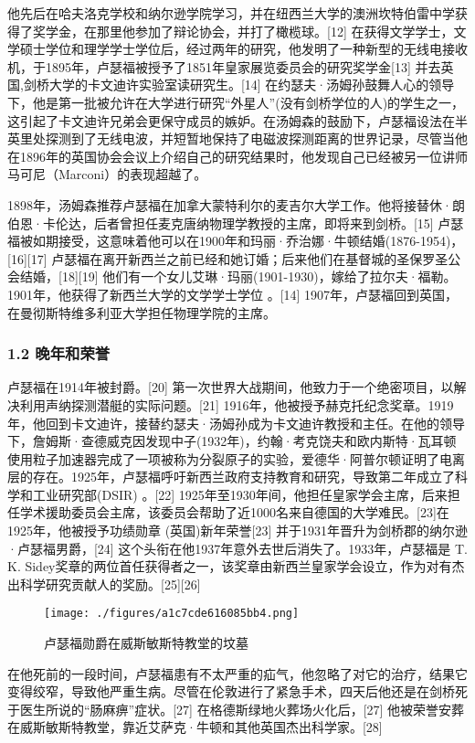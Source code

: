 他先后在哈夫洛克学校和纳尔逊学院学习，并在纽西兰大学的澳洲坎特伯雷中学获得了奖学金，在那里他参加了辩论协会，并打了橄榄球。[12] 在获得文学学士，文学硕士学位和理学学士学位后，经过两年的研究，他发明了一种新型的无线电接收机，于1895年，卢瑟福被授予了1851年皇家展览委员会的研究奖学金[13] 并去英国,剑桥大学的卡文迪许实验室读研究生。[14] 在约瑟夫·汤姆孙鼓舞人心的领导下，他是第一批被允许在大学进行研究“外星人”(没有剑桥学位的人)的学生之一，这引起了卡文迪许兄弟会更保守成员的嫉妒。在汤姆森的鼓励下，卢瑟福设法在半英里处探测到了无线电波，并短暂地保持了电磁波探测距离的世界记录，尽管当他在1896年的英国协会会议上介绍自己的研究结果时，他发现自己已经被另一位讲师马可尼（Marconi）的表现超越了。

1898年，汤姆森推荐卢瑟福在加拿大蒙特利尔的麦吉尔大学工作。他将接替休·朗伯恩·卡伦达，后者曾担任麦克唐纳物理学教授的主席，即将来到剑桥。[15] 卢瑟福被如期接受，这意味着他可以在1900年和玛丽·乔治娜·牛顿结婚(1876-1954)，[16][17] 卢瑟福在离开新西兰之前已经和她订婚；后来他们在基督城的圣保罗圣公会结婚，[18][19] 他们有一个女儿艾琳·玛丽(1901-1930)，嫁给了拉尔夫·福勒。1901年，他获得了新西兰大学的文学学士学位 。[14] 1907年，卢瑟福回到英国，在曼彻斯特维多利亚大学担任物理学院的主席。

\subsubsection{1.2 晚年和荣誉}
卢瑟福在1914年被封爵。[20] 第一次世界大战期间，他致力于一个绝密项目，以解决利用声纳探测潜艇的实际问题。[21] 1916年，他被授予赫克托纪念奖章。1919年，他回到卡文迪许，接替约瑟夫·汤姆孙成为卡文迪许教授和主任。在他的领导下，詹姆斯·查德威克因发现中子(1932年)，约翰·考克饶夫和欧内斯特·瓦耳顿使用粒子加速器完成了一项被称为分裂原子的实验，爱德华·阿普尔顿证明了电离层的存在。1925年，卢瑟福呼吁新西兰政府支持教育和研究，导致第二年成立了科学和工业研究部(DSIR) 。[22] 1925年至1930年间，他担任皇家学会主席，后来担任学术援助委员会主席，该委员会帮助了近1000名来自德国的大学难民。[23]在1925年，他被授予功绩勋章 (英国)新年荣誉[23] 并于1931年晋升为剑桥郡的纳尔逊·卢瑟福男爵，[24] 这个头衔在他1937年意外去世后消失了。1933年，卢瑟福是 T. K. Sidey奖章的两位首任获得者之一，该奖章由新西兰皇家学会设立，作为对有杰出科学研究贡献人的奖励。[25][26]
\begin{figure}[ht]
\centering
\texttt{[image: ./figures/a1c7cde616085bb4.png]}
\caption{卢瑟福勋爵在威斯敏斯特教堂的坟墓} \label{fig_Ernest_2}
\end{figure}
在他死前的一段时间，卢瑟福患有不太严重的疝气，他忽略了对它的治疗，结果它变得绞窄，导致他严重生病。尽管在伦敦进行了紧急手术，四天后他还是在剑桥死于医生所说的“肠麻痹”症状。[27] 在格德斯绿地火葬场火化后，[27] 他被荣誉安葬在威斯敏斯特教堂，靠近艾萨克·牛顿和其他英国杰出科学家。[28]

